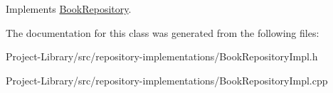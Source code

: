 Implements \hyperlink{classBookRepository_af4ffa5253ce6cd4e0e2d24d32090daab}{Book\+Repository}.



The documentation for this class was generated from the following files\+:\begin{DoxyCompactItemize}
\item 
Project-\/\+Library/src/repository-\/implementations/Book\+Repository\+Impl.\+h\item 
Project-\/\+Library/src/repository-\/implementations/Book\+Repository\+Impl.\+cpp\end{DoxyCompactItemize}
